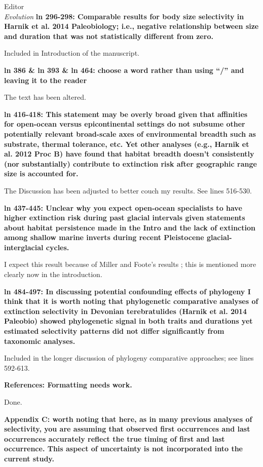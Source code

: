 \documentclass{letter}
\begin{document}
\begin{letter}{Editor \\ \textit{Evolution}}
  \textbf{ln 296-298: Comparable results for body size selectivity in Harnik et al. 2014 Paleobiology; i.e., negative relationship between size and duration that was not statistically different from zero.}

  Included in Introduction of the manuscript.

  \textbf{ln 386 \& ln 393 \& ln 464: choose a word rather than using “/” and leaving it to the reader}

  The text has been altered.

  \textbf{ln 416-418: This statement may be overly broad given that affinities for open-ocean versus epicontinental settings do not subsume other potentially relevant broad-scale axes of environmental breadth such as substrate, thermal tolerance, etc. Yet other analyses (e.g., Harnik et al. 2012 Proc B) have found that habitat breadth doesn’t consistently (nor substantially) contribute to extinction risk after geographic range size is accounted for.}

  The Discussion has been adjusted to better couch my results. See lines 516-530. %

  \textbf{ln 437-445: Unclear why you expect open-ocean specialists to have higher extinction risk during past glacial intervals given statements about habitat persistence made in the Intro and the lack of extinction among shallow marine inverts during recent Pleistocene glacial-interglacial cycles.}

  I expect this result because of Miller and Foote's results \cite{Miller2009a}; this is mentioned more clearly now in the introduction. 

  \textbf{ln 484-497: In discussing potential confounding effects of phylogeny I think that it is worth noting that phylogenetic comparative analyses of extinction selectivity in Devonian terebratulides (Harnik et al. 2014 Paleobio) showed phylogenetic signal in both traits and durations yet estimated selectivity patterns did not differ significantly from taxonomic analyses.}

  Included in the longer discussion of phylogeny comparative approaches; see lines 592-613. %

  \textbf{References: Formatting needs work.}

  Done.

  \textbf{Appendix C: worth noting that here, as in many previous analyses of selectivity, you are assuming that observed first occurrences and last occurrences accurately reflect the true timing of first and last occurrence. This aspect of uncertainty is not incorporated into the current study.}


\end{letter}
\end{document}
